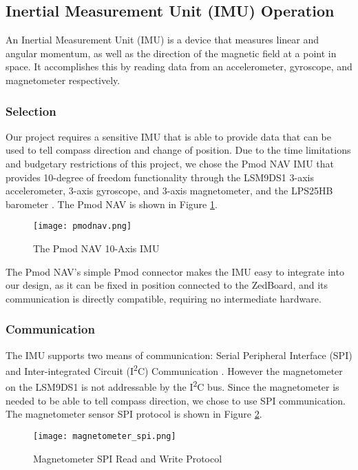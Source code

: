 \subsection{Inertial Measurement Unit (IMU) Operation}
An Inertial Measurement Unit (IMU) is a device that measures linear and angular momentum, as well as the direction of the magnetic field at a point in space. It accomplishes this by reading data from an accelerometer, gyroscope, and magnetometer respectively. 

\subsubsection{Selection}
Our project requires a sensitive IMU that is able to provide data that can be used to tell compass direction and change of position. Due to the time limitations and budgetary restrictions of this project, we chose the Pmod NAV IMU that provides 10-degree of freedom functionality through the LSM9DS1 3-axis accelerometer, 3-axis gyroscope, and 3-axis magnetometer, and the LPS25HB barometer \cite{lsm9ds1, lps25hd}. The Pmod NAV is shown in Figure \ref{pmodnav}.

\begin{figure}[H]
	\centerline{\texttt{[image: pmodnav.png]}}
	\caption{The Pmod NAV 10-Axis IMU \cite{pmodnav_ref}}
	\label{pmodnav}
\end{figure}

The Pmod NAV's simple Pmod connector makes the IMU easy to integrate into our design, as it can be fixed in position connected to the ZedBoard, and its communication is directly compatible, requiring no intermediate hardware.

\subsubsection{Communication}
The IMU supports two means of communication: Serial Peripheral Interface (SPI) and Inter-integrated Circuit (I\textsuperscript{2}C) Communication \cite{lsm9ds1}. However the magnetometer on the LSM9DS1 is not addressable by the I\textsuperscript{2}C bus. Since the magnetometer is needed to be able to tell compass direction, we chose to use SPI communication. The magnetometer sensor SPI protocol is shown in Figure \ref{magnetometer_spi}.

\begin{figure}[H]
	\centerline{\texttt{[image: magnetometer\_spi.png]}}
	\caption{Magnetometer SPI Read and Write Protocol \cite{lsm9ds1}}
	\label{magnetometer_spi}
\end{figure}


